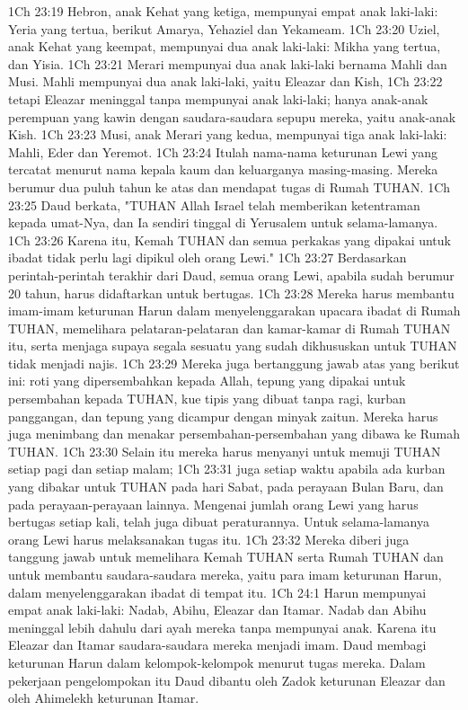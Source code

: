 1Ch 23:19  Hebron, anak Kehat yang ketiga, mempunyai empat anak laki-laki: Yeria yang tertua, berikut Amarya, Yehaziel dan Yekameam.
1Ch 23:20  Uziel, anak Kehat yang keempat, mempunyai dua anak laki-laki: Mikha yang tertua, dan Yisia.
1Ch 23:21  Merari mempunyai dua anak laki-laki bernama Mahli dan Musi. Mahli mempunyai dua anak laki-laki, yaitu Eleazar dan Kish,
1Ch 23:22  tetapi Eleazar meninggal tanpa mempunyai anak laki-laki; hanya anak-anak perempuan yang kawin dengan saudara-saudara sepupu mereka, yaitu anak-anak Kish.
1Ch 23:23  Musi, anak Merari yang kedua, mempunyai tiga anak laki-laki: Mahli, Eder dan Yeremot.
1Ch 23:24  Itulah nama-nama keturunan Lewi yang tercatat menurut nama kepala kaum dan keluarganya masing-masing. Mereka berumur dua puluh tahun ke atas dan mendapat tugas di Rumah TUHAN.
1Ch 23:25  Daud berkata, "TUHAN Allah Israel telah memberikan ketentraman kepada umat-Nya, dan Ia sendiri tinggal di Yerusalem untuk selama-lamanya.
1Ch 23:26  Karena itu, Kemah TUHAN dan semua perkakas yang dipakai untuk ibadat tidak perlu lagi dipikul oleh orang Lewi."
1Ch 23:27  Berdasarkan perintah-perintah terakhir dari Daud, semua orang Lewi, apabila sudah berumur 20 tahun, harus didaftarkan untuk bertugas.
1Ch 23:28  Mereka harus membantu imam-imam keturunan Harun dalam menyelenggarakan upacara ibadat di Rumah TUHAN, memelihara pelataran-pelataran dan kamar-kamar di Rumah TUHAN itu, serta menjaga supaya segala sesuatu yang sudah dikhususkan untuk TUHAN tidak menjadi najis.
1Ch 23:29  Mereka juga bertanggung jawab atas yang berikut ini: roti yang dipersembahkan kepada Allah, tepung yang dipakai untuk persembahan kepada TUHAN, kue tipis yang dibuat tanpa ragi, kurban panggangan, dan tepung yang dicampur dengan minyak zaitun. Mereka harus juga menimbang dan menakar persembahan-persembahan yang dibawa ke Rumah TUHAN.
1Ch 23:30  Selain itu mereka harus menyanyi untuk memuji TUHAN setiap pagi dan setiap malam;
1Ch 23:31  juga setiap waktu apabila ada kurban yang dibakar untuk TUHAN pada hari Sabat, pada perayaan Bulan Baru, dan pada perayaan-perayaan lainnya. Mengenai jumlah orang Lewi yang harus bertugas setiap kali, telah juga dibuat peraturannya. Untuk selama-lamanya orang Lewi harus melaksanakan tugas itu.
1Ch 23:32  Mereka diberi juga tanggung jawab untuk memelihara Kemah TUHAN serta Rumah TUHAN dan untuk membantu saudara-saudara mereka, yaitu para imam keturunan Harun, dalam menyelenggarakan ibadat di tempat itu.
1Ch 24:1  Harun mempunyai empat anak laki-laki: Nadab, Abihu, Eleazar dan Itamar. Nadab dan Abihu meninggal lebih dahulu dari ayah mereka tanpa mempunyai anak. Karena itu Eleazar dan Itamar saudara-saudara mereka menjadi imam. Daud membagi keturunan Harun dalam kelompok-kelompok menurut tugas mereka. Dalam pekerjaan pengelompokan itu Daud dibantu oleh Zadok keturunan Eleazar dan oleh Ahimelekh keturunan Itamar.
